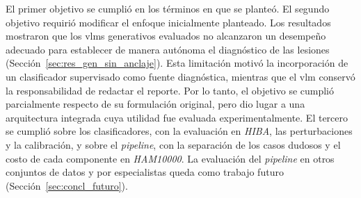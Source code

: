 El primer objetivo se cumplió en los términos en que se planteó. El segundo objetivo requirió modificar el enfoque inicialmente planteado. Los resultados mostraron que los \glspl{vlm} generativos evaluados no alcanzaron un desempeño adecuado para establecer de manera autónoma el diagnóstico de las lesiones (Sección~\ref{sec:res_gen_sin_anclaje}). Esta limitación motivó la incorporación de un clasificador supervisado como fuente diagnóstica, mientras que el \gls{vlm} conservó la responsabilidad de redactar el reporte. Por lo tanto, el objetivo se cumplió parcialmente respecto de su formulación original, pero dio lugar a una arquitectura integrada cuya utilidad fue evaluada experimentalmente. El tercero se cumplió sobre los clasificadores, con la evaluación en \emph{HIBA}, las perturbaciones y la calibración, y
sobre el \emph{pipeline}, con la separación de los casos dudosos y el costo de cada componente en \emph{HAM10000}. La evaluación del \emph{pipeline} en otros conjuntos de datos y por especialistas queda como trabajo futuro (Sección~\ref{sec:concl_futuro}).
